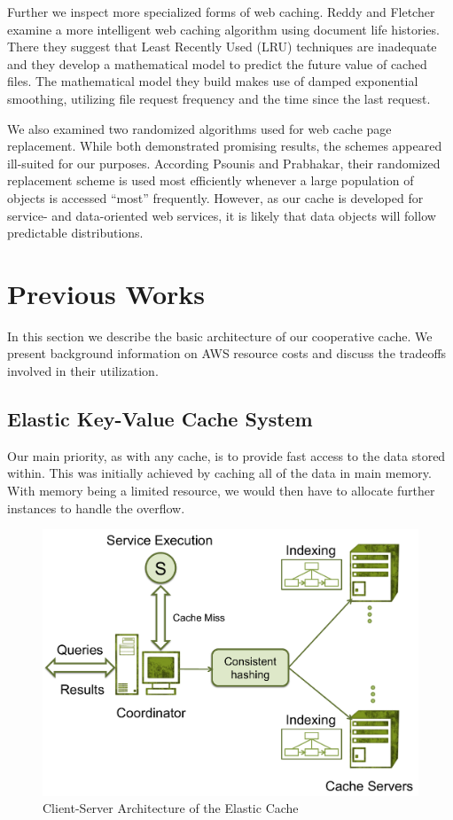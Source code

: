 Further we inspect more specialized forms of web caching. Reddy and Fletcher
examine a more intelligent web caching algorithm using document life
histories\cite{webcache2}. There they suggest that Least Recently Used (LRU)
techniques are inadequate and they develop a mathematical model to predict the
future value of cached files.  The mathematical model they build makes use of
damped exponential smoothing, utilizing file request frequency and the time
since the last request.

We also examined two randomized algorithms used for web cache page
replacement\cite{webcache3,webcache4}. While both demonstrated promising
results, the schemes appeared ill-suited for our purposes. According Psounis
and Prabhakar, their randomized replacement scheme is used most efficiently
whenever a large population of objects is accessed ``most'' frequently.
However, as our cache is developed for service- and data-oriented web services,
it is likely that data objects will follow predictable distributions.

\section{Previous Works}
In this section we describe the basic architecture of our cooperative cache. We
present background information on AWS resource costs and discuss the tradeoffs
involved in their utilization.

\subsection{Elastic Key-Value Cache System} %
\label{sec:Elastic_Key-Value_Cache_System}
Our main priority, as with any cache, is to provide fast access to the data
stored within. This was initially achieved by caching all of the data in main
memory. With memory being a limited resource, we would then have to allocate
further instances to handle the overflow.

\begin{figure}
\begin{center}
\includegraphics[scale=0.5]{figures/arch.pdf}
\end{center}
\caption{Client-Server Architecture of the Elastic Cache}
\label{fig:architecture}
\end{figure}

